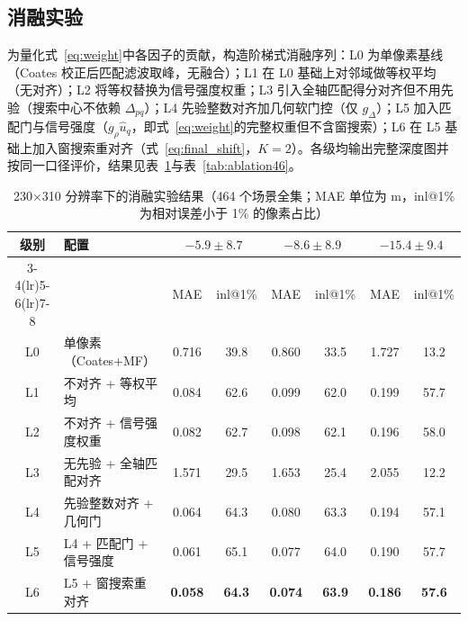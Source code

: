 \subsection{消融实验}
\label{sec:ablation}

为量化式~\eqref{eq:weight}中各因子的贡献，构造阶梯式消融序列：L0 为单像素基线（Coates 校正后匹配滤波取峰，无融合）；L1 在 L0 基础上对邻域做等权平均（无对齐）；L2 将等权替换为信号强度权重；L3 引入全轴匹配得分对齐但不用先验（搜索中心不依赖 $\Delta_{pq}$）；L4 先验整数对齐加几何软门控（仅 $g_\Delta$）；L5 加入匹配门与信号强度（$g_\rho\hat u_q$，即式~\eqref{eq:weight}的完整权重但不含窗搜索）；L6 在 L5 基础上加入窗搜索重对齐（式~\eqref{eq:final_shift}，$K=2$）。各级均输出完整深度图并按同一口径评价，结果见表~\ref{tab:ablation230}与表~\ref{tab:ablation46}。

\begin{table}[!t]
\centering
\caption{230×310 分辨率下的消融实验结果（464 个场景全集；MAE 单位为 m，inl@1\% 为相对误差小于 1\% 的像素占比）}
\label{tab:ablation230}\scriptsize\setlength{\tabcolsep}{2.5pt}
\begin{tabular}{clcccccc}
\toprule
\multirow{2}{*}{级别} & \multirow{2}{*}{配置} & \multicolumn{2}{c}{$-5.9\pm8.7$} & \multicolumn{2}{c}{$-8.6\pm8.9$} & \multicolumn{2}{c}{$-15.4\pm9.4$} \\
\cmidrule(lr){3-4}\cmidrule(lr){5-6}\cmidrule(lr){7-8}
 & & MAE & inl@1\% & MAE & inl@1\% & MAE & inl@1\% \\
\midrule
L0 & 单像素（Coates+MF） & 0.716 & 39.8 & 0.860 & 33.5 & 1.727 & 13.2 \\
L1 & 不对齐 + 等权平均 & 0.084 & 62.6 & 0.099 & 62.0 & 0.199 & 57.7 \\
L2 & 不对齐 + 信号强度权重 & 0.082 & 62.7 & 0.098 & 62.1 & 0.196 & 58.0 \\
L3 & 无先验 + 全轴匹配对齐 & 1.571 & 29.5 & 1.653 & 25.4 & 2.055 & 12.2 \\
L4 & 先验整数对齐 + 几何门 & 0.064 & 64.3 & 0.080 & 63.3 & 0.194 & 57.1 \\
L5 & L4 + 匹配门 + 信号强度 & 0.061 & 65.1 & 0.077 & 64.0 & 0.190 & 57.7 \\
L6 & L5 + 窗搜索重对齐 & \textbf{0.058} & \textbf{64.3} & \textbf{0.074} & \textbf{63.9} & \textbf{0.186} & \textbf{57.6} \\
\bottomrule
\end{tabular}
\end{table}

